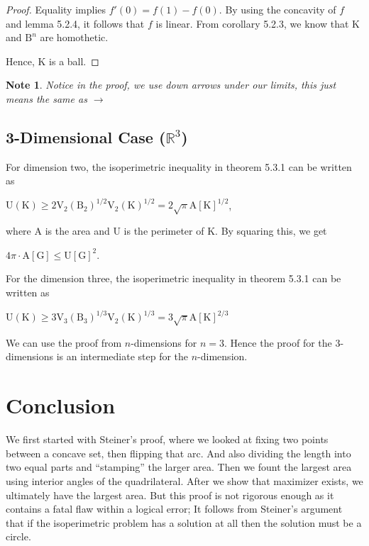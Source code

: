 \documentclass[a4paper]{book}
\newtheorem{note}[theorem]{Note}%
\numberwithin{theorem}{section}%
\begin{document}
\begin{proof}
    Equality implies $f'(0)=f(1)-f(0)$. By using the concavity of $f$ and lemma 5.2.4, it follows that $f$ is linear. From corollary 5.2.3, we know that $\mathrm{K}$ and $\mathrm{B}^{n}$ are homothetic.

    Hence, $\mathrm{K}$ is a ball.
\end{proof}

\begin{note}
    Notice in the proof, we use down arrows under our limits, this just means the same as $\to$
\end{note}

\subsection{3-Dimensional Case ($\mathbb{R}^{3}$)}
For dimension two, the isoperimetric inequality in theorem 5.3.1 can be written as
\begin{center}
$\displaystyle \mathrm{U}(\mathrm{K})\geq 2\mathrm{V}_{2}(\mathrm{B}_{2})^{1/2}\mathrm{V}_{2}(\mathrm{K})^{1/2}=2\sqrt{\pi}\mathrm{A}[\mathrm{K}]^{1/2}$,
\end{center}
where $\mathrm{A}$ is the area and $\mathrm{U}$ is the perimeter of $\mathrm{K}$. By squaring this, we get
\begin{center}
$4\pi\cdot\mathrm{A}[\mathrm{G}]\leq\mathrm{U}[\mathrm{G}]^{2}$.
\end{center}

For the dimension three, the isoperimetric inequality in theorem 5.3.1 can be written as
\begin{center}
$\displaystyle \mathrm{U}(\mathrm{K})\geq 3\mathrm{V}_{3}(\mathrm{B}_{3})^{1/3}\mathrm{V}_{2}(\mathrm{K})^{1/3}=3\sqrt{\pi}\mathrm{A}[\mathrm{K}]^{2/3}$
\end{center}
We can use the proof from $n$-dimensions for $n=3$. Hence the proof for the $3$-dimensions is an intermediate step for the $n$-dimension.

\section*{Conclusion}
We first started with Steiner's proof, where we looked at fixing two points between a concave set, then flipping that arc. And also dividing the length into two equal parts and ``stamping'' the larger area. Then we fount the largest area using interior angles of the quadrilateral. After we show that maximizer exists, we ultimately have the largest area. But this proof is not rigorous enough as it contains a fatal flaw within a logical error; It follows from Steiner’s argument that if the isoperimetric problem has a solution at all then the solution must be a circle.
\end{document}
